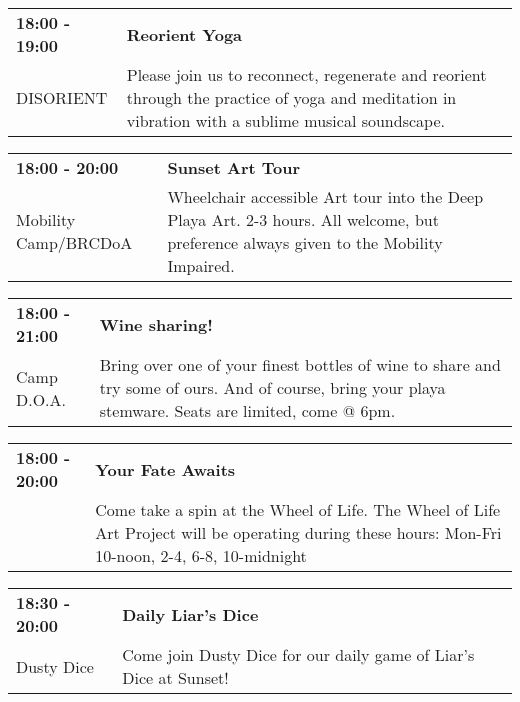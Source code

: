 \begin{tabular}{ p{1in} p{2.2in} }
    \textbf{18:00 - 19:00} & \textbf{Reorient Yoga} \\
    DISORIENT \newline  & Please join us to reconnect, regenerate and reorient through the practice of yoga and meditation in vibration with a sublime musical soundscape. \\
    \hline 
\end{tabular}
    
\begin{tabular}{ p{1in} p{2.2in} }
    \textbf{18:00 - 20:00} & \textbf{Sunset Art Tour} \\
    Mobility Camp/BRCDoA \newline  & Wheelchair accessible Art tour into the Deep Playa Art.
2-3 hours. All welcome, but preference always given to the Mobility Impaired. \\
    \hline 
\end{tabular}
    
\begin{tabular}{ p{1in} p{2.2in} }
    \textbf{18:00 - 21:00} & \textbf{Wine sharing!} \\
    Camp D.O.A. \newline  & Bring over one of your finest bottles of wine to share and try some of ours. And of course, bring your playa stemware. Seats are limited, come @ 6pm. \\
    \hline 
\end{tabular}
    
\begin{tabular}{ p{1in} p{2.2in} }
    \textbf{18:00 - 20:00} & \textbf{Your Fate Awaits} \\
    ~ \newline  & Come take a spin at the Wheel of Life. The Wheel of Life Art Project will be operating during these hours:
Mon-Fri 10-noon, 2-4, 6-8, 10-midnight \\
    \hline 
\end{tabular}
    
\begin{tabular}{ p{1in} p{2.2in} }
    \textbf{18:30 - 20:00} & \textbf{Daily Liar's Dice} \\
    Dusty Dice \newline  & Come join Dusty Dice for our daily game of Liar's Dice at Sunset! \\
    \hline 
\end{tabular}
    
